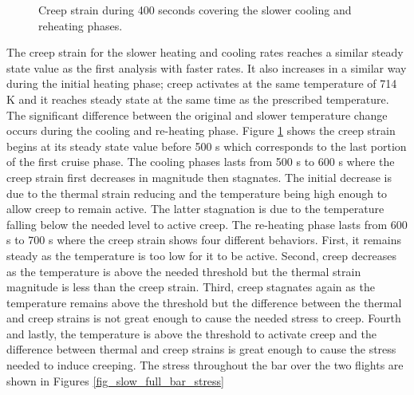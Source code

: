 \documentclass[conf]{new-aiaa}
\begin{document}
\begin{figure}[H]
  \centering
  \caption{ Creep strain during 400 seconds covering the slower 
            cooling and reheating phases.}
  \label{fig_slow_touchdown}
\end{figure}

The creep strain for the slower heating and cooling rates 
reaches a similar steady state value as the first analysis with faster rates.
It also increases in a similar way during the initial 
heating phase;
creep activates at the same temperature of 714 K and
it reaches steady state at the same time as the prescribed temperature.
The significant difference between the original and slower temperature
change occurs during the cooling and re-heating phase.
Figure \ref{fig_slow_touchdown} shows the creep strain
begins at its steady state value before 500 s
which corresponds to the last portion of the first cruise phase.
The cooling phases lasts from 500 s to 600 s where
the creep strain first decreases in magnitude then stagnates.
The initial decrease is due to the thermal strain reducing and
the temperature being high enough to allow creep to remain active.
The latter stagnation is due to the temperature falling below
the needed level to active creep. 
The re-heating phase lasts from 600 s to 700 s where the
creep strain shows four different behaviors.
First, it remains steady as the temperature is too low for it to be active.
Second, creep decreases as the temperature is above the needed threshold
but the thermal strain magnitude is less than the creep strain.
Third, creep stagnates again as the temperature remains 
above the threshold but the difference
between the thermal and creep strains is not great enough to cause
the needed stress to creep. 
Fourth and lastly, the temperature is above the threshold to activate 
creep and the difference between thermal and creep strains is 
great enough to cause the stress needed to induce creeping.
The stress 
throughout the bar
over the two flights are shown in Figures 
\ref{fig_slow_full_bar_stress} 
\end{document}
